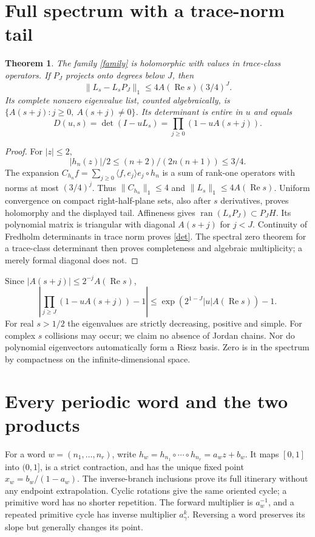 \documentclass[10pt]{article}
\newtheorem{theorem}{Theorem}
\newcommand{\Ree}{\operatorname{Re}}
\begin{document}
\section{Full spectrum with a trace-norm tail}
\begin{theorem}\label{spectrum}
The family \eqref{family} is holomorphic with values in trace-class
operators. If $P_J$ projects onto degrees below $J$, then
\[
 \|L_s-L_sP_J\|_1\le4A(\Ree s)(3/4)^J.
\]
Its complete nonzero eigenvalue list, counted algebraically, is
$\{A(s+j):j\ge0,\ A(s+j)\ne0\}$. Its determinant is entire in $u$ and equals
\begin{equation}\label{det}
 D(u,s)=\det(I-uL_s)=\prod_{j\ge0}(1-uA(s+j)).
\end{equation}
\end{theorem}
\begin{proof}
For $|z|\le2$,
\[
 |h_n(z)|/2\le(n+2)/(2n(n+1))\le3/4.
\]
The expansion $C_{h_n}f=\sum_{j\ge0}\langle f,e_j\rangle e_j\circ h_n$
is a sum of rank-one operators with norms at most $(3/4)^j$.
Thus $\|C_{h_n}\|_1\le4$ and $\|L_s\|_1\le4A(\Ree s)$.
Uniform convergence on compact right-half-plane sets, also after
$s$ derivatives, proves holomorphy and the displayed tail.
Affineness gives $\operatorname{ran}(L_sP_J)\subset P_JH$.
Its polynomial matrix is triangular with diagonal $A(s+j)$ for $j<J$.
Continuity of Fredholm determinants in trace norm proves \eqref{det}.
The spectral zero theorem for a trace-class determinant then proves
completeness and algebraic multiplicity; a merely formal diagonal does not.
\end{proof}
Since $|A(s+j)|\le2^{-j}A(\Ree s)$,
\begin{equation}\label{tail}
 \left|\prod_{j\ge J}(1-uA(s+j))-1\right|
 \le \exp\!\left(2^{1-J}|u|A(\Ree s)\right)-1 .
\end{equation}
For real $s>1/2$ the eigenvalues are strictly decreasing, positive and simple.
For complex $s$ collisions may occur; we claim no absence of Jordan chains.
Nor do polynomial eigenvectors automatically form a Riesz basis.
Zero is in the spectrum by compactness on the infinite-dimensional space.

\section{Every periodic word and the two products}
For a word $w=(n_1,\ldots,n_r)$, write
$h_w=h_{n_1}\circ\cdots\circ h_{n_r}=a_wz+b_w$.
It maps $[0,1]$ into $(0,1]$, is a strict contraction, and has the unique
fixed point $x_w=b_w/(1-a_w)$. The inverse-branch inclusions prove its full
itinerary without any endpoint extrapolation. Cyclic rotations give the
same oriented cycle; a primitive word has no shorter repetition.
The forward multiplier is $a_w^{-1}$, and a repeated primitive cycle
has inverse multiplier $a_\gamma^k$. Reversing a word preserves its slope
but generally changes its point.
\end{document}
